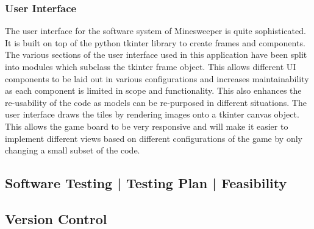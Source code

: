 \documentclass[12pt, a4]{report}
\begin{document}
\subsubsection{User Interface}
The user interface for the software system of Minesweeper is quite sophisticated. It is built on top of the python tkinter library to create frames and components. The various sections of the user interface used in this application have been split into modules which subclass the tkinter frame object. This allows different UI components to be laid out in various configurations and increases maintainability as each component is limited in scope and functionality. This also enhances the re-usability of the code as models can be re-purposed in different situations. The user interface draws the tiles by rendering images onto a tkinter canvas object. This allows the game board to be very responsive and will make it easier to implement different views based on different configurations of the game by only changing a small subset of the code.

\subsection{Software Testing | Testing Plan | Feasibility}
\par 


\subsection{Version Control}
\par 


	
	
	

\end{document}
